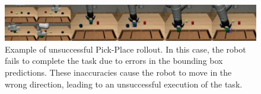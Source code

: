 \begin{figure}[t]
    \centering
    \includegraphics[width=1.0\textwidth]{figures/images/ch3/error_propagation.jpg}
    \caption{Example of unsuccessful Pick-Place rollout. In this case, the robot fails to complete the task due to errors in the bounding box predictions. These inaccuracies cause the robot to move in the wrong direction, leading to an unsuccessful execution of the task.}
    \label{fig:error_propagation}
\end{figure}
